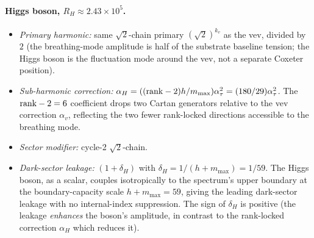 ﻿\documentclass[reprint,amsmath,amssymb,aps,prd,longbibliography,floatfix]{revtex4-2}
\begin{document}
\paragraph{Higgs boson, $R_H \approx 2.43 \times 10^5$.}
\begin{itemize}
\item \emph{Primary harmonic:} same $\sqrt{2}$-chain primary
$(\sqrt{2})^{k_v}$ as the vev, divided by $2$ (the breathing-mode
amplitude is half of the substrate baseline tension; the Higgs boson
is the fluctuation mode around the vev, not a separate Coxeter
position).
\item \emph{Sub-harmonic correction:} $\alpha_H = (({\rm rank}-2) h /
m_{\max}) \alpha_\tau^2 = (180/29) \alpha_\tau^2$. The
${\rm rank}-2 = 6$ coefficient drops two Cartan generators relative to
the vev correction $\alpha_v$, reflecting the two fewer rank-locked
directions accessible to the breathing mode.
\item \emph{Sector modifier:} cycle-2 $\sqrt{2}$-chain.
\item \emph{Dark-sector leakage:} $(1 + \delta_H)$ with
$\delta_H = 1/(h + m_{\max}) = 1/59$. The Higgs boson, as a scalar,
couples isotropically to the spectrum's upper boundary at the
boundary-capacity scale $h + m_{\max} = 59$, giving the leading
dark-sector leakage with no internal-index suppression. The sign of
$\delta_H$ is positive (the leakage \emph{enhances} the boson's
amplitude, in contrast to the rank-locked correction $\alpha_H$ which
reduces it).
\end{itemize}
\end{document}
